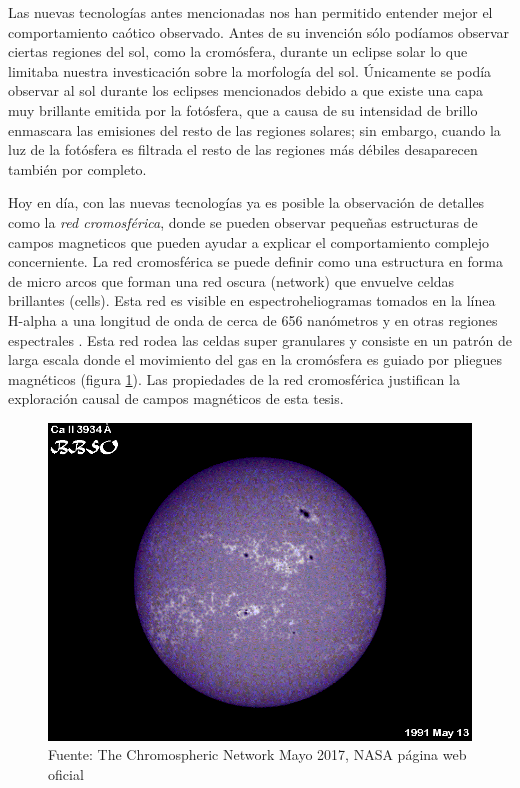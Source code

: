 \documentclass[9pt]{book}
\begin{document}
Las nuevas tecnolog\'ias antes mencionadas nos han permitido entender mejor el comportamiento ca\'otico observado. Antes de su invenci\'on s\'olo pod\'iamos observar ciertas regiones del sol, como la crom\'osfera, durante un eclipse solar lo que limitaba nuestra investicaci\'on sobre la morfolog\'ia del sol. \'Unicamente se pod\'ia observar al sol durante los eclipses mencionados debido a que existe una capa muy brillante emitida por la fot\'osfera, que a causa de su intensidad de brillo enmascara las emisiones del resto de las regiones solares; sin embargo, cuando la luz de la fot\'osfera es filtrada el resto de las regiones m\'as d\'ebiles desaparecen tambi\'en por completo.

Hoy en d\'ia, con las nuevas tecnolog\'ias ya es posible la observaci\'on de detalles como la \emph{red cromosf\'erica}, donde se pueden observar peque\~nas estructuras de campos magneticos que pueden ayudar a explicar el comportamiento complejo concerniente.
La red cromosf\'erica se puede definir como una estructura en forma de micro arcos que forman una red oscura (network) que envuelve celdas brillantes (cells). Esta red es visible en espectroheliogramas tomados en la l\'inea H-alpha a una longitud de onda de cerca de 656 nan\'ometros y en otras regiones espectrales \cite{NASAweb}. Esta red rodea las celdas super granulares y consiste en un patr\'on de larga escala donde el movimiento del gas en la crom\'osfera es guiado por pliegues magn\'eticos (figura \ref{fig:chromosphericnet}). Las propiedades de la red cromosf\'erica justifican la exploraci\'on causal de campos magn\'eticos de esta tesis.

\begin{figure}[h]

\centering
\includegraphics[scale=0.3]{CAII3934}
\caption{Fuente: The Chromospheric Network Mayo 2017, NASA p\'agina web oficial}
\label{fig:chromosphericnet}
\end{figure}
\end{document}
